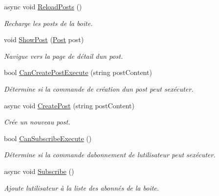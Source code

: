\begin{DoxyCompactItemize}
\item 
async void \hyperlink{class_boxes_1_1_view_models_1_1_box_view_model_a4c35e7b854c81c282304a92f3fb3e523}{Reload\+Posts} ()
\begin{DoxyCompactList}\small\item\em Recharge les posts de la boite. \end{DoxyCompactList}\item 
void \hyperlink{class_boxes_1_1_view_models_1_1_box_view_model_a3ead27c3d16e57a7e2b523be44cb871c}{Show\+Post} (\hyperlink{class_boxes_1_1_models_1_1_post}{Post} post)
\begin{DoxyCompactList}\small\item\em Navigue vers la page de détail d\textquotesingle{}un post. \end{DoxyCompactList}\item 
bool \hyperlink{class_boxes_1_1_view_models_1_1_box_view_model_a656200473ada1e9638e1ad2ee8989a36}{Can\+Create\+Post\+Execute} (string post\+Content)
\begin{DoxyCompactList}\small\item\em Détermine si la commande de création d\textquotesingle{}un post peut s\textquotesingle{}exécuter. \end{DoxyCompactList}\item 
async void \hyperlink{class_boxes_1_1_view_models_1_1_box_view_model_a27d014c5d81cca460a012bcc70ab6cf3}{Create\+Post} (string post\+Content)
\begin{DoxyCompactList}\small\item\em Crée un nouveau post. \end{DoxyCompactList}\item 
bool \hyperlink{class_boxes_1_1_view_models_1_1_box_view_model_a5194b22ad23218436dc55399f72a3873}{Can\+Subscribe\+Execute} ()
\begin{DoxyCompactList}\small\item\em Détermine si la commande d\textquotesingle{}abonnement de l\textquotesingle{}utilisateur peut s\textquotesingle{}exécuter. \end{DoxyCompactList}\item 
async void \hyperlink{class_boxes_1_1_view_models_1_1_box_view_model_ae7e74b230a31a6c4b68df809d5107e0e}{Subscribe} ()
\begin{DoxyCompactList}\small\item\em Ajoute l\textquotesingle{}utilisateur à la liste des abonnés de la boite. \end{DoxyCompactList}\item 

\end{DoxyCompactItemize}
